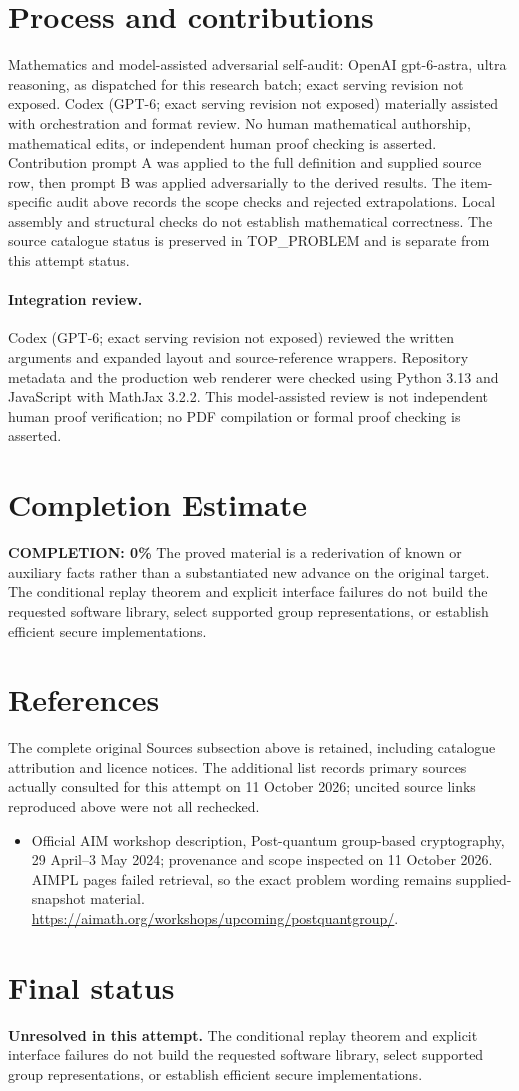 \documentclass[11pt]{article}
\begin{document}
\section{Process and contributions}
Mathematics and model-assisted adversarial self-audit: OpenAI gpt-6-astra, ultra reasoning, as dispatched for this research batch; exact serving revision not exposed. Codex (GPT-6; exact serving revision not exposed) materially assisted with orchestration and format review. No human mathematical authorship, mathematical edits, or independent human proof checking is asserted.
Contribution prompt A was applied to the full definition and supplied source row, then prompt B was applied adversarially to the derived results. The item-specific audit above records the scope checks and rejected extrapolations. Local assembly and structural checks do not establish mathematical correctness. The source catalogue status is preserved in TOP\_PROBLEM and is separate from this attempt status.
\paragraph{Integration review.} Codex (GPT-6; exact serving revision not exposed) reviewed the written arguments and expanded layout and source-reference wrappers. Repository metadata and the production web renderer were checked using Python 3.13 and JavaScript with MathJax 3.2.2. This model-assisted review is not independent human proof verification; no PDF compilation or formal proof checking is asserted.

\section{Completion Estimate}
\noindent\textbf{COMPLETION: 0\%}
The proved material is a rederivation of known or auxiliary facts rather than a substantiated new advance on the original target. The conditional replay theorem and explicit interface failures do not build the requested software library, select supported group representations, or establish efficient secure implementations.
\section{References}
The complete original Sources subsection above is retained, including catalogue attribution and licence notices. The additional list records primary sources actually consulted for this attempt on 11 October 2026; uncited source links reproduced above were not all rechecked.
\begin{itemize}
\item Official AIM workshop description, Post-quantum group-based cryptography, 29 April--3 May 2024; provenance and scope inspected on 11 October 2026. AIMPL pages failed retrieval, so the exact problem wording remains supplied-snapshot material. \url{https://aimath.org/workshops/upcoming/postquantgroup/}.
\end{itemize}
\section{Final status}
\textbf{Unresolved in this attempt.} The conditional replay theorem and explicit interface failures do not build the requested software library, select supported group representations, or establish efficient secure implementations.
\end{document}
